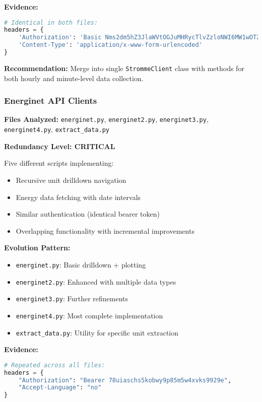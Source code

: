 \documentclass[11pt,a4paper]{article}
\begin{document}
\textbf{Evidence:}
\begin{lstlisting}[language=Python, caption={Identical authentication code in both files}]
# Identical in both files:
headers = {
    'Authorization': 'Basic Nms2dm5hZ3JlaWVtOGJuMHRycTlvZzloNWI6MW1wOTZtaWlsbm80MWRlbWJxcHFjaTRrZzdxazFnb2ZzOW5xazB0ZnFsajduMTVtam84NQ==',
    'Content-Type': 'application/x-www-form-urlencoded'
}
\end{lstlisting}

\textbf{Recommendation:} Merge into single \texttt{StrommeClient} class with methods for both hourly and minute-level data collection.

\subsubsection{Energinet API Clients}

\textbf{Files Analyzed:} \texttt{energinet.py}, \texttt{energinet2.py}, \texttt{energinet3.py}, \texttt{energinet4.py}, \texttt{extract\_data.py}

\textbf{Redundancy Level: CRITICAL}

Five different scripts implementing:
\begin{itemize}
    \item Recursive unit drilldown navigation
    \item Energy data fetching with date intervals
    \item Similar authentication (identical bearer token)
    \item Overlapping functionality with incremental improvements
\end{itemize}

\textbf{Evolution Pattern:}
\begin{itemize}
    \item \texttt{energinet.py}: Basic drilldown + plotting
    \item \texttt{energinet2.py}: Enhanced with multiple data types
    \item \texttt{energinet3.py}: Further refinements
    \item \texttt{energinet4.py}: Most complete implementation
    \item \texttt{extract\_data.py}: Utility for specific unit extraction
\end{itemize}

\textbf{Evidence:}
\begin{lstlisting}[language=Python, caption={Repeated authentication across all files}]
# Repeated across all files:
headers = {
    "Authorization": "Bearer 78uiaschs5kobwy9p85m5w4xvks9929e",
    "Accept-Language": "no"
}
\end{lstlisting}
\end{document}

